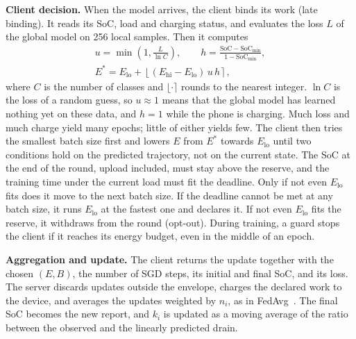\textbf{Client decision.}
When the model arrives, the client binds its work (late binding). It reads its
SoC, load and charging status, and evaluates the loss $L$ of the global model
on 256 local samples. Then it computes
\begin{equation}
  \begin{gathered}
  u = \min\!\left(1, \frac{L}{\ln C}\right), \qquad
  h = \frac{\mathrm{SoC}-\mathrm{SoC}_{\min}}{1-\mathrm{SoC}_{\min}},\\
  E^\ast = E_{\mathrm{lo}} + \left\lfloor (E_{\mathrm{hi}}-E_{\mathrm{lo}})\,u\,h \right\rceil,
  \end{gathered}
  \label{eq:decision}
\end{equation}
where $C$ is the number of classes and $\lfloor\cdot\rceil$ rounds to the
nearest integer. $\ln C$ is the loss of a random guess, so $u\approx1$ means
that the global model has learned nothing yet on these data, and $h=1$ while
the phone is charging. Much loss and much charge yield many epochs; little of
either yields few. The client then tries the smallest batch size first and
lowers $E$ from $E^\ast$ towards $E_{\mathrm{lo}}$ until two conditions hold
on the predicted trajectory, not on the current state. The SoC at the end of
the round, upload included, must stay above the reserve, and the training time
under the current load must fit the deadline. Only if not even $E_{\mathrm{lo}}$
fits does it move to the next batch size. If the deadline cannot be met at any
batch size, it runs $E_{\mathrm{lo}}$ at the fastest one and declares it. If not
even $E_{\mathrm{lo}}$ fits the reserve, it withdraws from the round (opt-out).
During training, a guard stops the client if it reaches its energy budget, even
in the middle of an epoch.

\textbf{Aggregation and update.}
The client returns the update together with the chosen $(E,B)$, the number of
SGD steps, its initial and final SoC, and its loss. The server discards updates
outside the envelope, charges the declared work to the device, and averages
the updates weighted by $n_i$, as in FedAvg~\cite{mcmahan2017fedavg}. The final
SoC becomes the new report, and $k_i$ is updated as a moving average of the
ratio between the observed and the linearly predicted drain.

